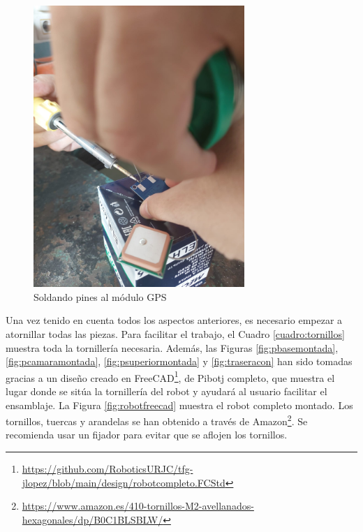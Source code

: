 \begin{figure} [h!]
	\begin{center}
		\includegraphics[width=8cm]{figs/cap5/soldar.jpeg}
	\end{center}
	\caption{Soldando pines al módulo GPS} 
	\label{fig:soldar}
\end{figure}

Una vez tenido en cuenta todos los aspectos anteriores, es necesario empezar a atornillar todas las piezas. Para facilitar el trabajo, el Cuadro \ref{cuadro:tornillos} muestra toda la tornillería necesaria. Además, las Figuras \ref{fig:pbasemontada}, \ref{fig:pcamaramontada}, \ref{fig:psuperiormontada} y \ref{fig:traseracon} han sido tomadas gracias a un diseño creado en FreeCAD\footnote{\url{https://github.com/RoboticsURJC/tfg-jlopez/blob/main/design/robotcompleto.FCStd}}, de Pibotj completo, que muestra el lugar donde se sitúa la tornillería del robot y ayudará al usuario facilitar el ensamblaje. La Figura \ref{fig:robotfreecad} muestra el robot completo montado. Los tornillos, tuercas y arandelas se han obtenido a través de Amazon\footnote{\url{https://www.amazon.es/410-tornillos-M2-avellanados-hexagonales/dp/B0C1BLSBLW/}}. Se recomienda usar un fijador para evitar que se aflojen los tornillos.

